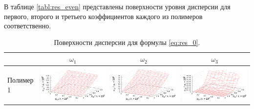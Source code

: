 \documentclass[11pt,a4paper]{article}
\theoremstyle{definition}
\begin{document}
В таблице \ref{tabl:res_even} представлены
поверхности уровня дисперсии для первого, второго и третьего коэффициентов каждого из полимеров
соответственно.

\begin{table}[h]
  \centering
  \footnotesize
  \caption{Поверхности дисперсии для формулы \eqref{eq:res_0}.}
  \begin{tabular}{l | c c c}
	  & $\omega_1$ & $\omega_2$ & $\omega_3$ \\ \hline
	\begin{rotate}{90}Полимер 1\end{rotate} &	\includegraphics[scale=0.4]{figs/even/p1.txt_coeff0.dat.eps} & \includegraphics[scale=0.4]{figs/even/p1.txt_coeff1.dat.eps} & \includegraphics[scale=0.4]{figs/even/p1.txt_coeff2.dat.eps} \\

\end{tabular}
\end{table}
\end{document}
